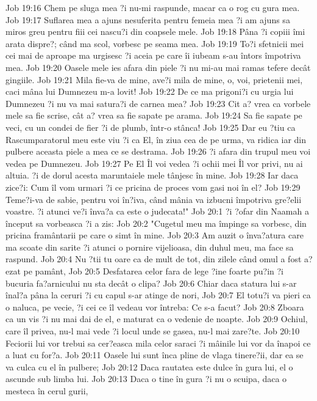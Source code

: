 Job 19:16  Chem pe sluga mea ?i nu-mi raspunde, macar ca o rog cu gura mea.
Job 19:17  Suflarea mea a ajuns nesuferita pentru femeia mea ?i am ajuns sa miros greu pentru fiii cei nascu?i din coapsele mele.
Job 19:18  Pâna ?i copiii îmi arata dispre?; când ma scol, vorbesc pe seama mea.
Job 19:19  To?i sfetnicii mei cei mai de aproape ma urgisesc ?i aceia pe care îi iubeam s-au întors împotriva mea.
Job 19:20  Oasele mele ies afara din piele ?i nu mi-au mai ramas tefere decât gingiile.
Job 19:21  Mila fie-va de mine, ave?i mila de mine, o, voi, prietenii mei, caci mâna lui Dumnezeu m-a lovit!
Job 19:22  De ce ma prigoni?i cu urgia lui Dumnezeu ?i nu va mai satura?i de carnea mea?
Job 19:23  Cit a? vrea ca vorbele mele sa fie scrise, cât a? vrea sa fie sapate pe arama.
Job 19:24  Sa fie sapate pe veci, cu un condei de fier ?i de plumb, într-o stânca!
Job 19:25  Dar eu ?tiu ca Rascumparatorul meu este viu ?i ca El, în ziua cea de pe urma, va ridica iar din pulbere aceasta piele a mea ce se destrama.
Job 19:26  ?i afara din trupul meu voi vedea pe Dumnezeu.
Job 19:27  Pe El Îl voi vedea ?i ochii mei Îl vor privi, nu ai altuia. ?i de dorul acesta maruntaiele mele tânjesc în mine.
Job 19:28  Iar daca zice?i: Cum îl vom urmari ?i ce pricina de proces vom gasi noi în el?
Job 19:29  Teme?i-va de sabie, pentru voi în?iva, când mânia va izbucni împotriva gre?elii voastre. ?i atunci ve?i înva?a ca este o judecata!"
Job 20:1  ?i ?ofar din Naamah a început sa vorbeasca ?i a zis:
Job 20:2  "Cugetul meu ma împinge sa vorbesc, din pricina framântarii pe care o simt în mine.
Job 20:3  Am auzit o înva?atura care ma scoate din sarite ?i atunci o pornire vijelioasa, din duhul meu, ma face sa raspund.
Job 20:4  Nu ?tii tu oare ca de mult de tot, din zilele când omul a fost a?ezat pe pamânt,
Job 20:5  Desfatarea celor fara de lege ?ine foarte pu?in ?i bucuria fa?arnicului nu sta decât o clipa?
Job 20:6  Chiar daca statura lui s-ar înal?a pâna la ceruri ?i cu capul s-ar atinge de nori,
Job 20:7  El totu?i va pieri ca o naluca, pe vecie, ?i cei ce îl vedeau vor întreba: Ce s-a facut?
Job 20:8  Zboara ca un vis ?i nu mai dai de el, e maturat ca o vedenie de noapte.
Job 20:9  Ochiul, care îl privea, nu-l mai vede ?i locul unde se gasea, nu-l mai zare?te.
Job 20:10  Feciorii lui vor trebui sa cer?easca mila celor saraci ?i mâinile lui vor da înapoi ce a luat cu for?a.
Job 20:11  Oasele lui sunt înca pline de vlaga tinere?ii, dar ea se va culca cu el în pulbere;
Job 20:12  Daca rautatea este dulce în gura lui, el o ascunde sub limba lui.
Job 20:13  Daca o tine în gura ?i nu o scuipa, daca o mesteca în cerul gurii,
